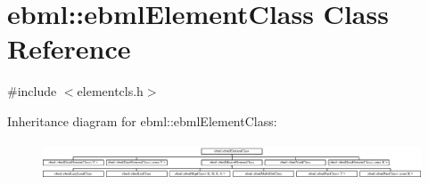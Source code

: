 \hypertarget{classebml_1_1ebmlElementClass}{}\section{ebml\+:\+:ebml\+Element\+Class Class Reference}
\label{classebml_1_1ebmlElementClass}


{\ttfamily \#include $<$elementcls.\+h$>$}

Inheritance diagram for ebml\+:\+:ebml\+Element\+Class\+:\begin{figure}[H]
\begin{center}
\leavevmode
\includegraphics[height=1.138211cm]{classebml_1_1ebmlElementClass}
\end{center}
\end{figure}
